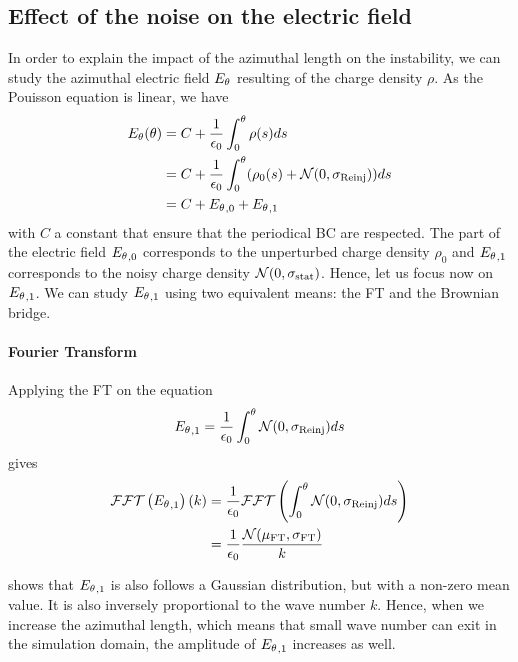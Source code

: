   \subsection{Effect of the noise on the electric field}
    \label{sec-mathnoise}
    In order to explain the impact of the azimuthal length on the instability, we can study the azimuthal electric field ${E_{\theta}}$ resulting of the charge density $\rho$.
    As the Pouisson equation is linear, we have
    \begin{align}
      {\ensuremath{E_{\theta}}}(\theta) &= C + \frac{1}{\epsilon_0} \int_0^{\theta} \rho(s) ds\\
                    &= C + \frac{1}{\epsilon_0} \int_0^{\theta} (\rho_0(s) + \mathcal{N}(0, \sigma_{\rm Reinj}) ) ds \\ 
                    &= C + {E_{\theta}}_{, 0} + {E_{\theta}}_{, 1}
    \end{align}
    with $C$ a constant that ensure that the periodical \ac{BC} are respected.
    The part of the electric field ${E_{\theta}}_{, 0}$ corresponds to the unperturbed charge density $\rho_0$ and ${E_{\theta}}_{, 1}$  corresponds to the noisy charge density $\mathcal{N}(0, \sigma_{\rm stat})$.
    Hence, let us focus now on ${E_{\theta}}_{, 1}$.
    We can study ${E_{\theta}}_{, 1}$ using two equivalent means\string: the \ac{FT} and the Brownian bridge.
    
    \paragraph{Fourier Transform \\}
      Applying the \ac{FT} on the equation
      \begin{equation} \label{eq-aziE1}
        {\ensuremath{E_{\theta}}}_{, 1} = \frac{1}{\epsilon_0} \int_0^{\theta}  \mathcal{N}(0, \sigma_{\rm Reinj}) ds
      \end{equation}
      gives    
      \begin{align}
         \mathcal{FFT} \left( {E_{\theta}}_{, 1} \right) (k) &= \frac{1}{\epsilon_0}  \mathcal{FFT} \left( \int_0^{\theta}  \mathcal{N}(0, \sigma_{\rm Reinj}) ds \right) \\
                                     &= \frac{1}{\epsilon_0} \frac{ \mathcal{N}(\mu_{\rm FT}, \sigma_{\rm FT})}{k} \label{eq-fft}
      \end{align}
      
       shows that ${E_{\theta}}_{, 1}$ is also follows a Gaussian distribution, but with a non-zero mean value.
      It is also inversely proportional to the wave number $k$.
      Hence, when we increase the azimuthal length, which means that small wave number can exit in the simulation domain, the amplitude of ${E_{\theta}}_{, 1}$ increases as well.
      
